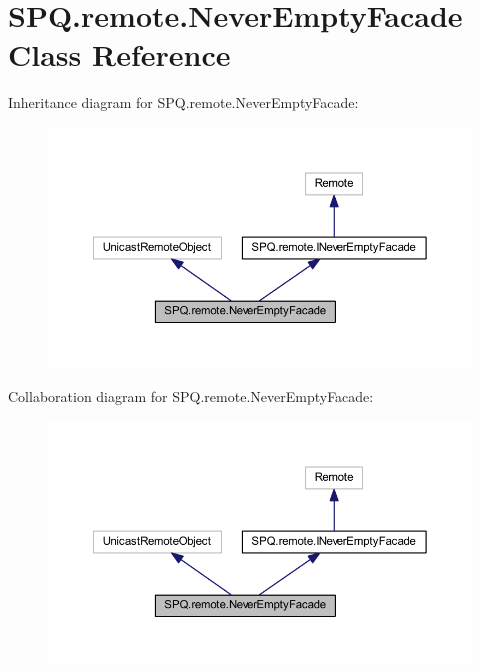 \hypertarget{class_s_p_q_1_1remote_1_1_never_empty_facade}{}\section{S\+P\+Q.\+remote.\+Never\+Empty\+Facade Class Reference}
\label{class_s_p_q_1_1remote_1_1_never_empty_facade}


Inheritance diagram for S\+P\+Q.\+remote.\+Never\+Empty\+Facade\+:
\nopagebreak
\begin{figure}[H]
\begin{center}
\leavevmode
\includegraphics[width=350pt]{class_s_p_q_1_1remote_1_1_never_empty_facade__inherit__graph}
\end{center}
\end{figure}


Collaboration diagram for S\+P\+Q.\+remote.\+Never\+Empty\+Facade\+:
\nopagebreak
\begin{figure}[H]
\begin{center}
\leavevmode
\includegraphics[width=350pt]{class_s_p_q_1_1remote_1_1_never_empty_facade__coll__graph}
\end{center}
\end{figure}
